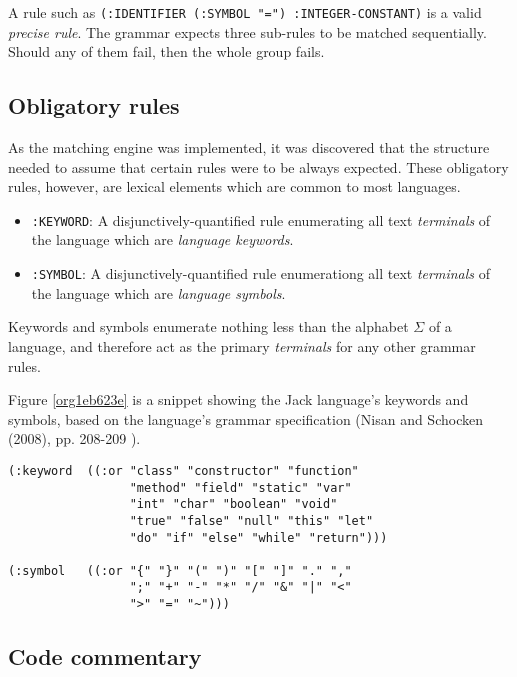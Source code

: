 \documentclass[a4paper,11pt,oneside]{article}
\begin{document}
A rule such as \texttt{(:IDENTIFIER (:SYMBOL "=") :INTEGER-CONSTANT)} is a
valid \emph{precise rule}. The grammar expects three sub-rules to be matched
sequentially. Should any of them fail, then the whole group fails.

\subsection*{Obligatory rules}
\label{sec:org0cfb616}

As the matching engine was implemented, it was discovered that the
structure needed to assume that certain rules were to be
always expected. These obligatory rules, however, are lexical elements
which are common to most languages.

\begin{itemize}
\item \texttt{:KEYWORD}: A disjunctively-quantified rule enumerating all text
\emph{terminals} of the language which are \emph{language keywords}.
\item \texttt{:SYMBOL}: A disjunctively-quantified rule enumerationg all text
\emph{terminals} of the language which are \emph{language symbols}.
\end{itemize}

Keywords and symbols enumerate nothing less than the alphabet \(\Sigma\)
of a language, and therefore act as the primary \emph{terminals} for any
other grammar rules.

Figure \ref{org1eb623e} is a snippet showing the Jack language's
keywords and symbols, based on the language's grammar specification
(Nisan and Schocken (2008), pp. 208-209 \cite{nand2tetris}).

\begin{verbatim}
(:keyword  ((:or "class" "constructor" "function"
                 "method" "field" "static" "var"
                 "int" "char" "boolean" "void"
                 "true" "false" "null" "this" "let"
                 "do" "if" "else" "while" "return")))

(:symbol   ((:or "{" "}" "(" ")" "[" "]" "." ","
                 ";" "+" "-" "*" "/" "&" "|" "<"
                 ">" "=" "~")))
\end{verbatim}

\subsection*{Code commentary}
\label{sec:org25189e5}
\end{document}
